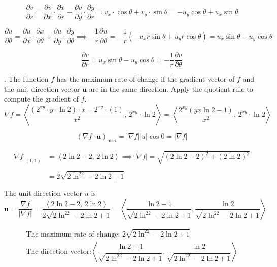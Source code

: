 \documentclass{article}
\begin{document}
\hfill

\[\frac{\partial v}{\partial r}=\frac{\partial v}{\partial x}\cdot\frac{\partial x}{\partial r}+\frac{\partial v}{\partial y}\cdot\frac{\partial y}{\partial r}=v_x\cdot\cos\theta+v_y\cdot\sin\theta=-u_y\cos\theta+u_x\sin\theta\]

\[\frac{\partial u}{\partial\theta}=\frac{\partial u}{\partial x}\cdot\frac{\partial x}{\partial\theta}+\frac{\partial u}{\partial y}\cdot\frac{\partial y}{\partial\theta}\implies-\frac1r\frac{\partial u}{\partial\theta}=-\frac1r\left(-u_x r\sin\theta+u_y r\cos\theta\right)=u_x\sin\theta-u_y\cos\theta\]

\[\frac{\partial v}{\partial r}=u_x\sin\theta-u_y\cos\theta=-\frac1r\frac{\partial u}{\partial \theta}\]

\hfill

. The function $f$ has the maximum rate of change if the gradient vector of $f$ and the unit direction vector $\mathbf u$ are in the same direction. Apply the quotient rule to compute the gradient of $f$.
\[\nabla f=\left\langle\frac{\left(2^{xy}\cdot y\cdot\ln2\right)\cdot x-2^{xy}\cdot(1)}{x^2},\,2^{xy}\cdot\ln2\right\rangle=\left\langle\frac{2^{xy}\left(yx\ln2-1\right)}{x^2},\,2^{xy}\cdot\ln2\right\rangle\]

\[\left(\nabla f\cdot\mathbf u\right)_{\text{max}}=\left|\nabla f\right||u|\cos0=|\nabla f|\]

\begin{align*}\nabla f|_{(1,1)}&=\left\langle2\ln2-2,\,2\ln2\right\rangle\implies|\nabla f|=\sqrt{\left(2\ln2-2\right)^2+\left(2\ln2\right)^2}\\\\&=2\sqrt{2\ln^22-2\ln2+1}\end{align*}

\hfill

\noindent The unit direction vector $u$ is
\[\mathbf{u}=\frac{\nabla f}{|\nabla f|}=\frac{\left\langle2\ln2-2,\,2\ln2\right\rangle}{2\sqrt{2\ln^22-2\ln2+1}}=\left\langle\frac{\ln2-1}{\sqrt{2\ln^22-2\ln2+1}},\frac{\ln2}{\sqrt{2\ln^22-2\ln2+1}}\right\rangle\]

\[\boxed{\begin{array}{c}\text{The maximum rate of change: }{2\sqrt{2\ln^22-2\ln2+1}}\\[1em]\text{The direction vector:}\left\langle\dfrac{\ln2-1}{\sqrt{2\ln^22-2\ln2+1}},\dfrac{\ln2}{\sqrt{2\ln^22-2\ln2+1}}\right\rangle\end{array}}\]

\hfill
\end{document}

